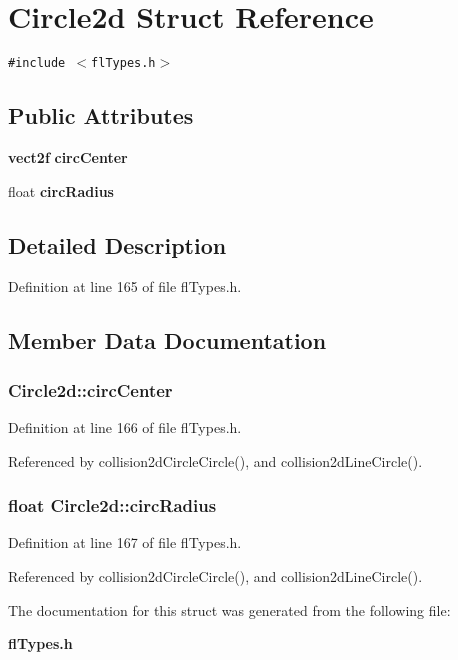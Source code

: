 \section{Circle2d Struct Reference}
\label{structCircle2d}
{\tt \#include $<$fl\-Types.h$>$}

\subsection*{Public Attributes}
\begin{CompactItemize}
\item 
{\bf vect2f} {\bf circ\-Center}
\item 
float {\bf circ\-Radius}
\end{CompactItemize}


\subsection{Detailed Description}




Definition at line 165 of file fl\-Types.h.

\subsection{Member Data Documentation}
\subsubsection{ {\bf Circle2d::circ\-Center}}\label{structCircle2d_3b3d8507f010f57d85f3db8cc71b26d4}




Definition at line 166 of file fl\-Types.h.

Referenced by collision2d\-Circle\-Circle(), and collision2d\-Line\-Circle().
\subsubsection{\setlength{\rightskip}{0pt plus 5cm}float {\bf Circle2d::circ\-Radius}}\label{structCircle2d_b88c61fd28956c2fbdfe2312f179b8d6}




Definition at line 167 of file fl\-Types.h.

Referenced by collision2d\-Circle\-Circle(), and collision2d\-Line\-Circle().

The documentation for this struct was generated from the following file:\begin{CompactItemize}
\item 
{\bf fl\-Types.h}\end{CompactItemize}
